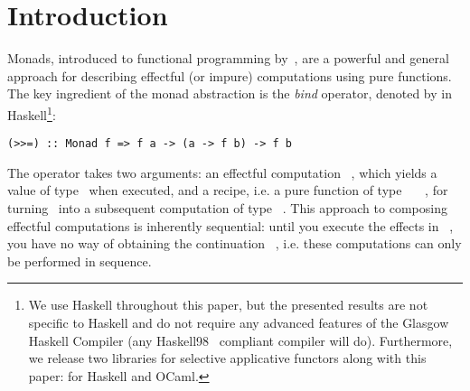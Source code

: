 \section{Introduction}\label{sec-intro}


Monads, introduced to functional programming by~\citet{1995_wadler_monads}, are
a powerful and general approach for describing effectful (or impure)
computations using pure functions. The key ingredient of the monad abstraction
is the \emph{bind} operator, denoted by \hs{>>=} in
Haskell\footnote{We use Haskell throughout this paper, but the presented results
are not specific to Haskell and do not require any advanced features of the
Glasgow Haskell Compiler (any Haskell98~\citep{haskell98} compliant compiler
will do). Furthermore, we release two libraries for selective applicative
functors along with this paper: for Haskell and OCaml.}:

\vspace{1mm}
\begin{verbatim}
(>>=) :: Monad f => f a -> (a -> f b) -> f b
\end{verbatim}
\vspace{1mm}

\noindent
The operator takes two arguments: an effectful computation ~, which
yields a value of type~ when executed, and a recipe, i.e. a pure function
of type ~\hs{->}~~, for turning~ into a subsequent
computation of type ~. This approach to composing effectful
computations is inherently sequential: until you execute the effects in
~, you have no way of obtaining the continuation ~,
i.e. these computations can only be performed in sequence.
